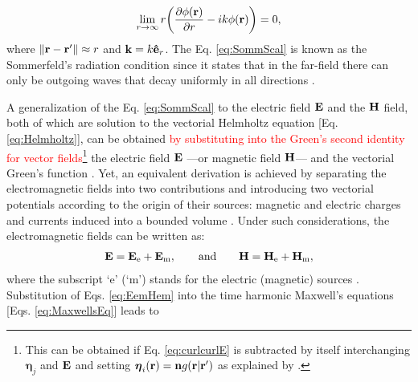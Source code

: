 %
%
%
%
\begin{align}
    \lim_{r\to \infty} r\qty(\pdv{\phi(\vb{r})}{r} - ik\phi(\vb{r})) = 0,
    \label{eq:SommScal}
\end{align}
%
where $\norm{\vb{r}-\vb{r}'} \approx r$ and $\vb{k} = k \vu{e}_r$. The Eq. \eqref{eq:SommScal} is known as the Sommerfeld's radiation condition since it states that in the far-field there can only be outgoing waves that decay uniformly in all directions \cite{schot_eighty_1992,jin_theory_2010,bondeson_computational_2005}.

A generalization of the Eq. \eqref{eq:SommScal} to the electric field $\vb{E}$ and the $\vb{H}$ field, both of which are solution to the vectorial Helmholtz equation [Eq. \eqref{eq:Helmholtz}], can be obtained \textcolor{red}{by substituting into the Green's second identity for vector fields\footnote{%
    This can be obtained if  Eq. \eqref{eq:curlcurlE} is subtracted by itself interchanging $\boldsymbol{\eta}_j $ and $\vb{E}$ and setting $\boldsymbol{\eta}_i(\vb{r}) = \vb{n}g(\vb{r}|\vb{r}')$ as explained by \citeauthor{stratton_diffraction_1939} \cite{stratton_diffraction_1939}.}%
    } the electric field  $\vb{E}$ ---or magnetic field $\vb{H}$--- and the vectorial Green's function \cite{schot_eighty_1992,silver_microwave_1984,colton_inverse_2019}. Yet, an equivalent derivation is achieved by separating the electromagnetic fields into two contributions and introducing  two vectorial potentials according to the origin of their sources: magnetic and electric  charges and currents induced into a bounded volume \cite{jin_theory_2010,bondeson_computational_2005}. Under such considerations, the electromagnetic fields can be written as:
%
\begin{align}
\vb{E} = \vb{E}_\text{e} + \vb{E}_\text{m},
    \qquad
    \text{and}
    \qquad
\vb{H} = \vb{H}_\text{e} + \vb{H}_\text{m},
\label{eq:EemHem}
\end{align}
%
where the subscript `e' (`m') stands for the electric (magnetic) sources \cite{jin_theory_2010}. Substitution of Eqs. \eqref{eq:EemHem} into the time harmonic Maxwell's equations [Eqs. \eqref{eq:MaxwellsEq}] leads to
%
%
%
